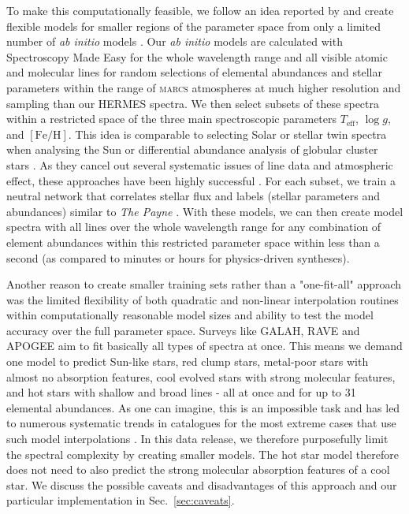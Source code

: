 \documentclass[
  journal=pasa,
  manuscript=research-paper, %
  year=2024,
  volume=37
]{cup-journal}
\newcommand{\Teff}{$T_\mathrm{eff}$\xspace}
\newcommand{\logg}{$\log g$\xspace}
\newcommand{\feh}{$\mathrm{[Fe/H]}$\xspace}
\newcommand{\marcs}{\textsc{marcs}\xspace}
\begin{document}
To make this computationally feasible, we follow an idea reported by \citet{Rix2016} and create flexible models for smaller regions of the parameter space from only a limited number of \textit{ab initio} models \citep[see also][]{Ting2016b}. Our \textit{ab initio} models are calculated with Spectroscopy Made Easy \citep[\textsc{sme}][]{Valenti1996,Piskunov2017} for the whole wavelength range and all visible atomic and molecular lines for random selections of elemental abundances and stellar parameters within the range of \marcs atmospheres \citep{Gustafsson2008} at much higher resolution and sampling than our HERMES spectra. We then select subsets of these spectra within a restricted space of the three main spectroscopic parameters \Teff, \logg, and \feh. This idea is comparable to selecting Solar or stellar twin spectra when analysing the Sun \citep[see e.g.]{Nissen2015} or differential abundance analysis of globular cluster stars \citep[e.g.]{Yong2013, Monty2023}. As they cancel out several systematic issues of line data and atmospheric effect, these approaches have been highly successful \citep{Nissen2018}. For each subset, we train a neutral network that correlates stellar flux and labels (stellar parameters and abundances) similar to \textit{The Payne} \citep{Ting2019}. With these models, we can then create model spectra with all lines over the whole wavelength range for any combination of element abundances within this restricted parameter space within less than a second (as compared to minutes or hours for physics-driven syntheses). 

Another reason to create smaller training sets rather than a "one-fit-all" approach was the limited flexibility of both quadratic and non-linear interpolation routines within computationally reasonable model sizes and ability to test the model accuracy over the full parameter space. Surveys like GALAH, RAVE and APOGEE aim to fit basically all types of spectra at once. This means we demand one model to predict Sun-like stars, red clump stars, metal-poor stars with almost no absorption features, cool evolved stars with strong molecular features, and hot stars with shallow and broad lines - all at once and for up to 31 elemental abundances. As one can imagine, this is an impossible task and has led to numerous systematic trends in catalogues for the most extreme cases that use such model interpolations \citep{Casey2016,Buder2018,Ting2019}. In this data release, we therefore purposefully limit the spectral complexity by creating smaller models. The hot star model therefore does not need to also predict the strong molecular absorption features of a cool star. We discuss the possible caveats and disadvantages of this approach and our particular implementation in Sec.~\ref{sec:caveats}.
\end{document}
